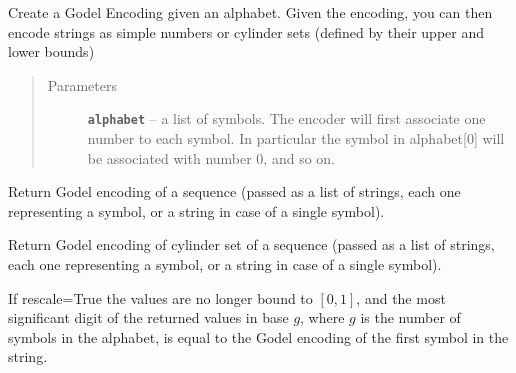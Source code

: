 \documentclass[letterpaper,10pt,english]{sphinxmanual}
\begin{document}
\begin{fulllineitems}
\label{symdyn_docs:symdyn.GodelEncoder}
Create a Godel Encoding given an alphabet. Given the encoding, you can
then encode strings as simple numbers or cylinder sets (defined by their
upper and lower bounds)
\begin{quote}\begin{description}
\item[{Parameters}] \leavevmode
\textbf{\texttt{alphabet}} -- a list of symbols. The encoder will first associate
one number to each symbol. In particular the symbol in alphabet{[}0{]}
will be associated with number 0, and so on.

\end{description}\end{quote}

\begin{fulllineitems}
\label{symdyn_docs:symdyn.GodelEncoder.encode_sequence}
Return Godel encoding of a sequence (passed as a list of strings,
each one representing a symbol, or a string in case of a single
symbol).

\end{fulllineitems}


\begin{fulllineitems}
\label{symdyn_docs:symdyn.GodelEncoder.encode_cylinder}
Return Godel encoding of cylinder set of a sequence (passed as a
list of strings, each one representing a symbol, or a string
in case of a single symbol).

If rescale=True the values are no
longer bound to \([0,1]\), and the most significant digit
of the returned values in base \(g\), where \(g\) is
the number of symbols in the alphabet, is equal to the Godel
encoding of the first symbol in the string.

\end{fulllineitems}


\end{fulllineitems}

\end{document}
